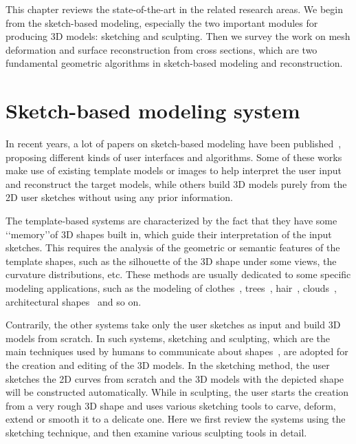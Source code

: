 This chapter reviews the state-of-the-art in the related research
areas.  We begin from the sketch-based modeling, especially the two
important modules for producing 3D models: sketching and sculpting.
Then we survey the work on mesh deformation and surface
reconstruction from cross sections, which are two fundamental
geometric algorithms in sketch-based modeling and reconstruction.



\section{Sketch-based modeling system}\label{ch2:sec:sbim}

In recent years, a lot of papers on sketch-based  modeling have been
published~\cite{OSSJ09}, proposing different kinds of user
interfaces and algorithms. Some of these works make use of existing
template models or images to help interpret the user input and
reconstruct the target models, while others build 3D models purely
from the 2D user sketches without using any prior information.

The template-based systems are characterized by  the fact that they
have some \lq\lq{memory}\rq\rq of 3D shapes built in, which guide
their interpretation of the input sketches. This requires the
analysis of the geometric or semantic features of the template
shapes, such as the silhouette of the 3D shape under some views, the
curvature distributions, etc. These methods are usually dedicated to
some specific modeling applications, such as the modeling of
clothes~\cite{TWBCH07}, trees~\cite{TST06,OOI06,CNXDK08},
hair~\cite{WBC07}, clouds~\cite{WBC08}, architectural
shapes~\cite{SketchUp} and so on.

Contrarily, the other systems take only the user  sketches as input
and build 3D models from scratch. In such systems, sketching and
sculpting, which are the main techniques used by humans to
communicate about shapes~\cite{CIW08}, are adopted for the creation
and editing of the 3D models. In the sketching method, the user
sketches the 2D curves from scratch and the 3D models with the
depicted shape will be constructed automatically. While in
sculpting, the user starts the creation from a very rough 3D shape
and uses various sketching tools to carve, deform, extend or smooth
it to a delicate one. Here we first review the systems using the
sketching technique, and then examine various sculpting tools in
detail.


